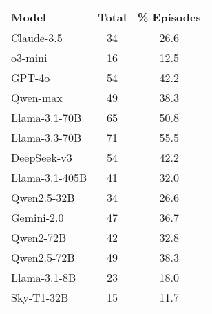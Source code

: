 \begin{tabular}{lcc}
\hline
\textbf{Model} & \textbf{Total} & \textbf{\%} \textbf{Episodes} \\
\hline
Claude-3.5 & 34 & 26.6 \\
o3-mini & 16 & 12.5 \\
GPT-4o & 54 & 42.2 \\
Qwen-max & 49 & 38.3 \\
Llama-3.1-70B & 65 & 50.8 \\
Llama-3.3-70B & 71 & 55.5 \\
DeepSeek-v3 & 54 & 42.2 \\
Llama-3.1-405B & 41 & 32.0 \\
Qwen2.5-32B & 34 & 26.6 \\
Gemini-2.0 & 47 & 36.7 \\
Qwen2-72B & 42 & 32.8 \\
Qwen2.5-72B & 49 & 38.3 \\
Llama-3.1-8B & 23 & 18.0 \\
Sky-T1-32B & 15 & 11.7 \\
\hline
\end{tabular}
